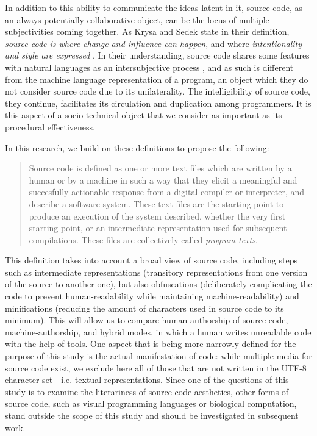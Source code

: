 In addition to this ability to communicate the ideas latent in it, source code, as an always potentially collaborative object, can be the locus of multiple subjectivities coming together. As Krysa and Sedek state in their definition, \emph{source code is where change and influence can happen}, and where \emph{intentionality and style are expressed} \citep{fuller_software_2008}. In their understanding, source code shares some features with natural languages as an intersubjective process \citep{voloshinov_marxism_1986}, and as such is different from the machine language representation of a program, an object which they do not consider source code due to its unilaterality. The intelligibility of source code, they continue, facilitates its circulation and duplication among programmers. It is this aspect of a socio-technical object that we consider as important as its procedural effectiveness.

In this research, we build on these definitions to propose the following:

\begin{quote}
    Source code is defined as one or more text files which are written by a human or by a machine in such a way that they elicit a meaningful and succesfully actionable response from a digital compiler or interpreter, and describe a software system. These text files are the starting point to produce an execution of the system described, whether the very first starting point, or an intermediate representation used for subsequent compilations. These files are collectively called \emph{program texts}.
\end{quote}

This definition takes into account a broad view of source code, including steps such as intermediate representations (transitory representations from one version of the source to another one), but also obfuscations (deliberately complicating the code to prevent human-readability while maintaining machine-readability) and minifications (reducing the amount of characters used in source code to its minimum). This will allow us to compare human-authorship of source code, machine-authorship, and hybrid modes, in which a human writes unreadable code with the help of tools. One aspect that is being more narrowly defined for the purpose of this study is the actual manifestation of code: while multiple media for source code exist, we exclude here all of those that are not written in the UTF-8 character set—i.e. textual representations. Since one of the questions of this study is to examine the literariness of source code aesthetics, other forms of source code, such as visual programming languages or biological computation, stand outside the scope of this study and should be investigated in subsequent work.

